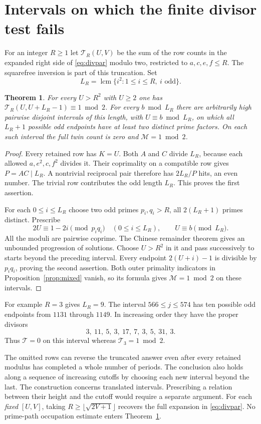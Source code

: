 \documentclass[11pt]{article}
\newtheorem{theorem}{Theorem}
\begin{document}
\section{Intervals on which the finite divisor test fails}
For an integer $R\ge1$ let $\mathcal T_R(U,V)$ be the sum of the
row counts in the expanded right side of \eqref{eq:divpar} modulo
two, restricted to $a,c,e,f\le R$. The squarefree inversion is part
of this truncation. Set
\[
       L_R=\operatorname{lcm}\{i^2:1\le i\le R,\ i\text{ odd}\}.
\]
\begin{theorem}\label{th:period}
For every $U>R^2$ with $U\ge2$ one has
$\mathcal T_R(U,U+L_R-1)\equiv1\bmod2$. For every $b\bmod L_R$ there
are arbitrarily high pairwise disjoint intervals of this length,
with $U\equiv b\bmod L_R$, on which all $L_R+1$ possible odd
endpoints have at least two distinct prime factors. On each such
interval the full twin count is zero and $\mathcal M=1\bmod2$.
\end{theorem}
\begin{proof}
Every retained row has $K=U$. Both $A$ and $C$ divide $L_R$,
because each allowed $a,e^2,c,f^2$ divides it. Their coprimality
on a compatible row gives $P=AC\mid L_R$. A nontrivial reciprocal
pair therefore has $2L_R/P$ hits, an even number. The trivial row
contributes the odd length $L_R$. This proves the first assertion.

For each $0\le i\le L_R$ choose two odd primes $p_i,q_i>R$,
all $2(L_R+1)$ primes distinct. Prescribe
\[
    2U\equiv1-2i\pmod{p_iq_i}\quad(0\le i\le L_R),\qquad
    U\equiv b\pmod{L_R}.
\]
All the moduli are pairwise coprime. The Chinese remainder theorem
gives an unbounded progression of solutions. Choose $U>R^2$ in it
and pass successively to starts beyond the preceding interval.
Every endpoint $2(U+i)-1$ is divisible by $p_iq_i$, proving the
second assertion. Both outer primality indicators in
Proposition~\ref{prop:mixed} vanish, so its formula gives
$\mathcal M=1\bmod2$ on these intervals.
\end{proof}

For example $R=3$ gives $L_R=9$. The interval $566\le j\le574$
has ten possible odd endpoints from $1131$ through $1149$. In
increasing order they have the proper divisors
\[
 3,\ 11,\ 5,\ 3,\ 17,\ 7,\ 3,\ 5,\ 31,\ 3 .
\]
Thus $\mathcal T=0$ on this interval whereas $\mathcal T_3=1\bmod2$.

The omitted rows can reverse the truncated answer even after every
retained modulus has completed a whole number of periods. The
conclusion also holds along a sequence of increasing cutoffs by
choosing each new interval beyond the last. The construction concerns
translated intervals. Prescribing a relation between their height
and the cutoff would require a separate argument. For each \emph{fixed}
$[U,V]$, taking $R\ge\lfloor\sqrt{2V+1}\rfloor$ recovers the
full expansion in \eqref{eq:divpar}. No prime-path
occupation estimate enters Theorem~\ref{th:period}.
\end{document}
